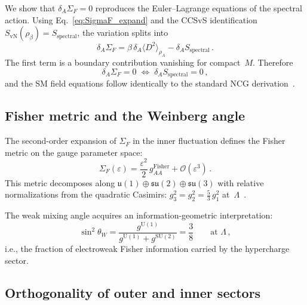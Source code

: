 \documentclass[prl,twocolumn,superscriptaddress,longbibliography]{revtex4-2}
\newcommand{\SvN}{S_{\mathrm{vN}}}
\begin{document}
We show that
$\delta_A \Sigma_F = 0$ reproduces the
Euler--Lagrange equations of the
spectral action.
Using Eq.~\eqref{eq:SigmaF_expand} and
the CCSvS identification~\cite{CCSvS2018}
$\SvN(\rho_\beta)
= S_{\mathrm{spectral}}$,
the variation splits into
\begin{equation}\label{eq:var_split}
  \delta_A \Sigma_F
  = \beta\,\delta_A
    \bigl\langle D^2 \bigr\rangle_{\!\rho_A}
  - \delta_A S_{\mathrm{spectral}}\,.
\end{equation}
The first term is a boundary contribution
vanishing for compact~$M$.
Therefore
\begin{equation}\label{eq:equivalence}
  \delta_A \Sigma_F = 0
  \;\Longleftrightarrow\;
  \delta_A S_{\mathrm{spectral}} = 0\,,
\end{equation}
and the SM field equations follow
identically to the standard NCG
derivation~\cite{CC1996,vS2024}.


\subsection{Fisher metric and the Weinberg angle}
\label{sec:Weinberg}

The second-order expansion of $\Sigma_F$ in the
inner fluctuation defines the Fisher metric
on the gauge parameter space:
\begin{equation}\label{eq:FisherF}
  \Sigma_F(\varepsilon)
  = \frac{\varepsilon^2}{2}\,
    g_{AA}^{\mathrm{Fisher}}
  + \mathcal{O}(\varepsilon^3)\,.
\end{equation}
This metric decomposes along
$\mathfrak{u}(1) \oplus \mathfrak{su}(2)
\oplus \mathfrak{su}(3)$
with relative normalizations from the
quadratic Casimirs:
$g_3^2 = g_2^2
= \tfrac{5}{3}\, g_1^2$
at~$\Lambda$~\cite{CC1996,vS2024}.

The weak mixing angle acquires an
information-geometric interpretation:
\begin{equation}\label{eq:sin2theta}
  \sin^2\theta_W
  = \frac{g^{\mathrm{U}(1)}}
  {g^{\mathrm{U}(1)} + g^{\mathrm{SU}(2)}}
  = \frac{3}{8}
  \qquad\text{at } \Lambda\,,
\end{equation}
i.e., the fraction of
electroweak Fisher information carried by the
hypercharge sector.


\subsection{Orthogonality of outer and inner sectors}
\label{sec:orthogonality}
\end{document}
